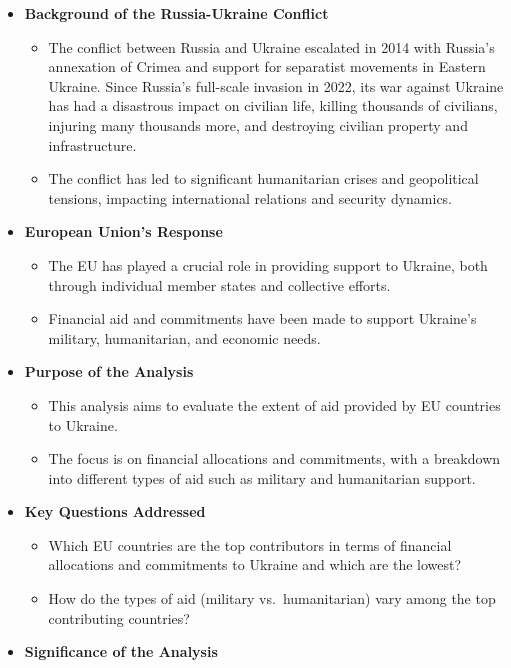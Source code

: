 \documentclass[12pt,preprint, authoryear]{elsarticle}
\numberwithin{equation}{section}
\numberwithin{figure}{section}
\numberwithin{table}{section}
\def\tightlist{} %
\begin{document}
\begin{itemize}
\tightlist
\item
  \textbf{Background of the Russia-Ukraine Conflict}

  \begin{itemize}
  \item
    The conflict between Russia and Ukraine escalated in 2014 with
    Russia's annexation of Crimea and support for separatist movements
    in Eastern Ukraine. Since Russia's full-scale invasion in 2022, its
    war against Ukraine has had a disastrous impact on civilian life,
    killing thousands of civilians, injuring many thousands more, and
    destroying civilian property and infrastructure.
  \item
    The conflict has led to significant humanitarian crises and
    geopolitical tensions, impacting international relations and
    security dynamics.
  \end{itemize}
\item
  \textbf{European Union's Response}

  \begin{itemize}
  \tightlist
  \item
    The EU has played a crucial role in providing support to Ukraine,
    both through individual member states and collective efforts.
  \item
    Financial aid and commitments have been made to support Ukraine's
    military, humanitarian, and economic needs.
  \end{itemize}
\item
  \textbf{Purpose of the Analysis}

  \begin{itemize}
  \tightlist
  \item
    This analysis aims to evaluate the extent of aid provided by EU
    countries to Ukraine.
  \item
    The focus is on financial allocations and commitments, with a
    breakdown into different types of aid such as military and
    humanitarian support.
  \end{itemize}
\item
  \textbf{Key Questions Addressed}

  \begin{itemize}
  \tightlist
  \item
    Which EU countries are the top contributors in terms of financial
    allocations and commitments to Ukraine and which are the lowest?
  \item
    How do the types of aid (military vs.~humanitarian) vary among the
    top contributing countries?
  \end{itemize}
\item
  \textbf{Significance of the Analysis}


\end{itemize}
\end{document}
